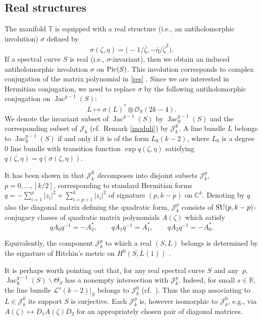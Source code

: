 \documentclass[10pt,a4paper]{amsart}
\newcommand{\cx}{{\mathbb C}}
\newcommand{\Jac}{\operatorname{Jac}}
\newcommand{\ol}{\overline}
\numberwithin{equation}{section}
\newcommand{\oR}{{\mathbb{R}}}
\newcommand{\oT}{{\mathbb{T}}}
\newcommand{\sO}{{\mathcal{O}}}
\begin{document}
\subsection{Real structures} The manifold $\oT$ is equipped with a real structure (i.e., an antiholomorphic involution) $\sigma$ defined by
\[
\sigma(\zeta,\eta)=\bigl(-1/\bar\zeta,-\bar\eta/\bar\zeta^2\bigr).
\]
If a spectral curve $S$ is real (i.e., $\sigma$-invariant), then we obtain an induced antiholomorphic involution $\sigma$ on ${\rm Pic}(S)$. This involution corresponds to complex conjugation of the matrix polynomial in \eqref{res} \cite[Section~1.2]{theta}. Since we are interested in Hermitian conjugation, we need to replace $\sigma$ by the following antiholomorphic conjugation on $\Jac^{g-1}(S)$:
\[
L\mapsto\sigma(L)^\ast\otimes \sO_S(2k-4).
\]
We denote the invariant subset of $\Jac^{g-1}(S)$ by $\Jac^{g-1}_\oR(S)$ and the corresponding subset of $\mathscr{J}_k$ (cf.\ Remark \ref{moduli})
by $\mathscr{J}_k^\oR$. A line bundle $L$ belongs to $\Jac^{g-1}_\oR(S)$ if and only if it is of the form $L_0(k-2)$, where $L_0$ is a degree $0$ line bundle with transition function $\exp q(\zeta,\eta)$ satisfying $\ol{q(\zeta,\eta)}=q(\sigma(\zeta,\eta))$.

It has been shown in \cite[Proposition~1.7]{theta} that $\mathscr{J}_k^\oR$ decomposes into disjoint subsets $\mathscr{J}_k^p$, $p=0,\dots,[k/2]$,
corresponding to standard Hermitian forms $q=-\sum_{i=1}^p |z_i|^2+\sum_{i=p+1}^k|z_i|^2$ of signature $(p,k-p)$ on $\cx^k$. Denoting by $q$ also the diagonal matrix defining the quadratic form, $\mathscr{J}_k^p$ consists of ${\rm SU}(p,k-p)$-conjugacy classes of quadratic matrix polynomials $A(\zeta)$ which satisfy
\[
qA_0q^{-1}=-A_2^\ast,\qquad qA_1q^{-1}=A_1^\ast,\qquad qA_2q^{-1}=-A_0^\ast.
\]

\begin{Remark} Equivalently, the component $\mathscr{J}_k^p$ to which a real $(S,L)$ belongs is determined by the signature of Hitchin's metric on $H^0(S,L(1))$ \cite[Section~6]{Hit}.
\end{Remark}
\begin{Remark} It is perhaps worth pointing out that, for any real spectral curve $S$ and any~$p$, $\Jac^{g-1}_\oR(S)\backslash \Theta_S$ has a nonempty intersection with $\mathscr{J}_k^p$. Indeed, for small $s\in \oR$, the line bundle $\mathscr{L}^s(k-2)|_S$ belongs to $\mathscr{J}_k^0$ (cf.~\cite[paragraph after formula~(6.11)]{Hit}). Thus the map associating to $L\in \mathscr{J}_k^0$ its support $S$ is surjective. Each $\mathscr{J}_k^p$ is, however isomorphic to $\mathscr{J}_k^0$, e.g., via $A(\zeta)\mapsto D_1A(\zeta)D_2$ for an appropriately chosen pair of diagonal matrices.
\end{Remark}
\end{document}

